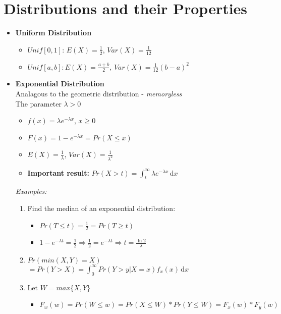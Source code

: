 \documentclass[a4paper]{article}
\begin{document}
\section{Distributions and their Properties}
\begin{itemize}
    \item \textbf{Uniform Distribution}
    \begin{itemize}
        \item $Unif[0,1]$: $E(X) = \frac{1}{2}$, $Var(X) = \frac{1}{12}$
        \item $Unif[a,b]: E(X) = \frac{a+b}{2}$, $Var(X) = \frac{1}{12} (b-a)^2$
    \end{itemize}
    \item \textbf{Exponential Distribution}\\
    Analagous to the geometric distribution - \textit{memoryless}\\
    The parameter $\lambda > 0$
    \begin{itemize}
        \item $f(x) = \lambda e^{-\lambda x}$, $x \geq 0$
        \item $F(x) = 1 - e^{-\lambda x} = Pr(X \leq x)$
        \item $E(X) = \frac{1}{\lambda}$, $Var(X) = \frac{1}{\lambda^2}$
        \item \textbf{Important result:} $Pr(X > t) = \int_{t}^\infty \lambda e^{-\lambda x} \, {\mathrm{d}}x$
    \end{itemize}
    \textit{Examples:}
    \begin{enumerate}
        \item Find the median of an exponential distribution:
        \begin{itemize}
            \item $Pr(T \leq t) = \frac{1}{2} = Pr(T \geq t)$
            \item $1 - e^{-\lambda t} = \frac{1}{2} \Rightarrow \frac{1}{2} = e^{-\lambda t} \Rightarrow t = \frac{\ln2}{\lambda}$
        \end{itemize}
        \item $Pr(min(X,Y) = X)$\\$ = Pr(Y > X) = \int_{0}^\infty Pr(Y > y | X= x)f_x(x) \, {\mathrm{d}}x$
        \item Let $W = max\{X,Y\}$
        \begin{itemize}
            \item $F_w(w) = Pr(W \leq w) = Pr(X \leq W) * Pr(Y \leq W) = F_x(w)* F_y(w)$
        \end{itemize}

\end{enumerate}
\end{itemize}
\end{document}
